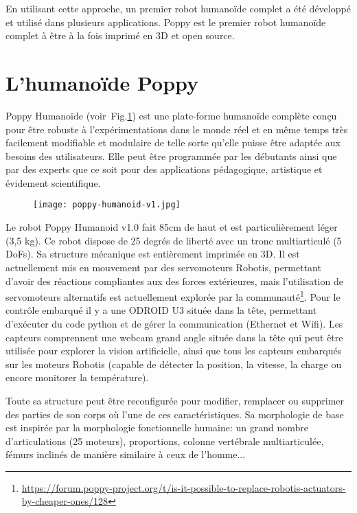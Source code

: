 En utilisant cette approche, un premier robot humanoïde complet a été développé et utilisé dans plusieurs applications. Poppy est le premier robot humanoïde complet à être à la fois imprimé en 3D et open source. 


\section*{L'humanoïde Poppy} %

Poppy Humanoïde (voir~Fig.\ref{fig:poppy_humanoid_v1}) est une plate-forme humanoïde complète conçu pour être robuste à l'expérimentations dans le monde réel et en même temps très facilement modifiable et modulaire de telle sorte qu'elle puisse être adaptée aux besoins des utilisateurs. Elle peut être programmée par les débutants ainsi que par des experts que ce soit pour des applications pédagogique, artistique et évidement scientifique.

  \begin{figure}[h]
      \begin{center}
          \texttt{[image: poppy-humanoid-v1.jpg]}
      \end{center}
      \caption{}
      \label{fig:poppy_humanoid_v1}
  \end{figure}

Le robot Poppy Humanoid v1.0 fait 85cm de haut et est particulièrement léger (3,5 kg). Ce robot dispose de 25 degrés de liberté avec un tronc multiarticulé (5 DoFs). Sa structure mécanique est entièrement imprimée en 3D. Il est actuellement mis en mouvement par des servomoteurs Robotis, permettant d'avoir des réactions compliantes aux des forces extérieures, mais l'utilisation de servomoteurs alternatifs est actuellement explorée par la communauté\footnote{\url{https://forum.poppy-project.org/t/is-it-possible-to-replace-robotis-actuators-by-cheaper-ones/128}}.
Pour le contrôle embarqué il y a une ODROID U3 située dans la tête, permettant d'exécuter du code python et de gérer la communication (Ethernet et Wifi).
Les capteurs comprennent une webcam grand angle située dans la tête qui peut être utilisée pour explorer la vision artificielle, ainsi que tous les capteurs embarqués sur les moteurs Robotis (capable de détecter la position, la vitesse, la charge ou encore monitorer la température).

Toute sa structure peut être reconfigurée pour modifier, remplacer ou supprimer des parties de son corps où l'une de ces caractéristiques. Sa morphologie de base est inspirée par la morphologie fonctionnelle humaine: un grand nombre d'articulations (25 moteurs), proportions, colonne vertébrale multiarticulée, fémurs inclinés de manière similaire à ceux de l'homme...


